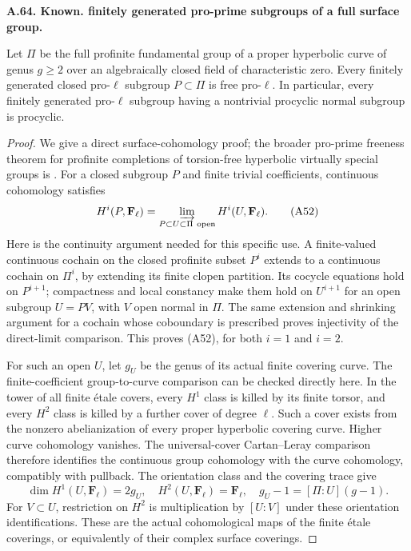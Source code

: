 \documentclass[11pt,oneside]{article}
\makeatletter
\newcounter{statementanchor}
\newenvironment{statement}[3]{%
 \refstepcounter{statementanchor}\def\@currentlabel{#1}%
 \par\addvspace{9pt}\noindent
 \textbf{#1. #2. #3.}\par\nobreak\noindent\ignorespaces
}{\par\addvspace{5pt}}
\makeatother
\begin{document}
\begin{statement}{A.64}{Known}{finitely generated pro-prime subgroups of a full surface group}
\label{st:A.64}
\label{A:surface-proprime-free}
Let $\Pi$ be the full profinite fundamental group
of a proper hyperbolic curve of genus $g\ge2$
over an algebraically closed field of characteristic
zero. Every finitely generated closed pro-$\ell$
subgroup $P\subset\Pi$ is free pro-$\ell$.
In particular, every finitely generated pro-$\ell$
subgroup having a nontrivial procyclic normal
subgroup is procyclic.
\end{statement}
\begin{proof}
We give a direct surface-cohomology proof; the
broader pro-prime freeness theorem for profinite
completions of torsion-free hyperbolic virtually
special groups is \cite[Theorem F]{A_WiltonZalesskii2017}.
For a closed subgroup $P$ and finite trivial
coefficients, continuous cohomology satisfies
\[
 H^i(P,\mathbf F_\ell)
       =\varinjlim_{P\subset U\subset\Pi\ \mathrm{open}}
                          H^i(U,\mathbf F_\ell).          \tag{A52}
\]
Here is the continuity argument needed for this
specific use. A finite-valued continuous cochain
on the closed profinite subset $P^i$ extends
to a continuous cochain on $\Pi^i$, by extending
its finite clopen partition. Its cocycle
equations hold on $P^{i+1}$; compactness and
local constancy make them hold on $U^{i+1}$
for an open subgroup $U=P V$, with $V$ open
normal in $\Pi$. The same extension and
shrinking argument for a cochain whose
coboundary is prescribed proves injectivity
of the direct-limit comparison. This proves
(A52), for both $i=1$ and $i=2$.

For such an open $U$, let $g_U$ be the genus
of its actual finite covering curve. The
finite-coefficient group-to-curve comparison
can be checked directly here. In the tower of
all finite \'etale covers, every $H^1$ class
is killed by its finite torsor, and every
$H^2$ class is killed by a further cover of
degree $\ell$. Such a cover exists from
the nonzero abelianization of every proper
hyperbolic covering curve. Higher curve
cohomology vanishes. The universal-cover
Cartan--Leray comparison therefore identifies
the continuous group cohomology with the
curve cohomology, compatibly with pullback.
The
orientation class and the covering trace give
\[
 \dim H^1(U,\mathbf F_\ell)=2g_U,
 \quad H^2(U,\mathbf F_\ell)=\mathbf F_\ell,
 \quad g_U-1=[\Pi:U](g-1).                                \tag{A53}
\]
For $V\subset U$, restriction on $H^2$ is
multiplication by $[U:V]$ under these orientation
identifications. These are the actual
cohomological maps of the finite \'etale
coverings, or equivalently of their complex
surface coverings.


\end{proof}
\end{document}

